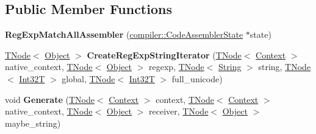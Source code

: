 \subsection*{Public Member Functions}
\begin{DoxyCompactItemize}
\item 
\mbox{\label{classv8_1_1internal_1_1RegExpMatchAllAssembler_a8b23babc57d6636a128d76b43012772a}} 
{\bfseries Reg\+Exp\+Match\+All\+Assembler} (\mbox{\hyperlink{classv8_1_1internal_1_1compiler_1_1CodeAssemblerState}{compiler\+::\+Code\+Assembler\+State}} $\ast$state)
\item 
\mbox{\label{classv8_1_1internal_1_1RegExpMatchAllAssembler_a4284100b9e9ed2cd981635ec54b73653}} 
\mbox{\hyperlink{classv8_1_1internal_1_1compiler_1_1TNode}{T\+Node}}$<$ \mbox{\hyperlink{classv8_1_1internal_1_1Object}{Object}} $>$ {\bfseries Create\+Reg\+Exp\+String\+Iterator} (\mbox{\hyperlink{classv8_1_1internal_1_1compiler_1_1TNode}{T\+Node}}$<$ \mbox{\hyperlink{classv8_1_1internal_1_1Context}{Context}} $>$ native\+\_\+context, \mbox{\hyperlink{classv8_1_1internal_1_1compiler_1_1TNode}{T\+Node}}$<$ \mbox{\hyperlink{classv8_1_1internal_1_1Object}{Object}} $>$ regexp, \mbox{\hyperlink{classv8_1_1internal_1_1compiler_1_1TNode}{T\+Node}}$<$ \mbox{\hyperlink{classv8_1_1internal_1_1String}{String}} $>$ string, \mbox{\hyperlink{classv8_1_1internal_1_1compiler_1_1TNode}{T\+Node}}$<$ \mbox{\hyperlink{structv8_1_1internal_1_1Int32T}{Int32T}} $>$ global, \mbox{\hyperlink{classv8_1_1internal_1_1compiler_1_1TNode}{T\+Node}}$<$ \mbox{\hyperlink{structv8_1_1internal_1_1Int32T}{Int32T}} $>$ full\+\_\+unicode)
\item 
\mbox{\label{classv8_1_1internal_1_1RegExpMatchAllAssembler_a64e60a5aca880ab799dae8ec607b20d1}} 
void {\bfseries Generate} (\mbox{\hyperlink{classv8_1_1internal_1_1compiler_1_1TNode}{T\+Node}}$<$ \mbox{\hyperlink{classv8_1_1internal_1_1Context}{Context}} $>$ context, \mbox{\hyperlink{classv8_1_1internal_1_1compiler_1_1TNode}{T\+Node}}$<$ \mbox{\hyperlink{classv8_1_1internal_1_1Context}{Context}} $>$ native\+\_\+context, \mbox{\hyperlink{classv8_1_1internal_1_1compiler_1_1TNode}{T\+Node}}$<$ \mbox{\hyperlink{classv8_1_1internal_1_1Object}{Object}} $>$ receiver, \mbox{\hyperlink{classv8_1_1internal_1_1compiler_1_1TNode}{T\+Node}}$<$ \mbox{\hyperlink{classv8_1_1internal_1_1Object}{Object}} $>$ maybe\+\_\+string)
\end{DoxyCompactItemize}

